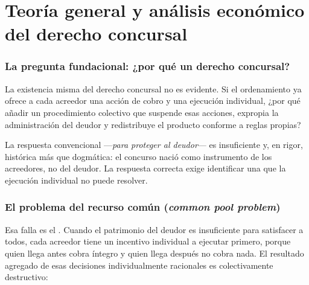 \chapter{Teoría general y análisis económico del derecho concursal}
\label{cap:teoria-economica}


\bloqueTeorico

\subsection{La pregunta fundacional: ¿por qué un derecho concursal?}

La existencia misma del derecho concursal no es evidente. Si el ordenamiento ya ofrece a cada
acreedor una acción de cobro y una ejecución individual, ¿por qué añadir un procedimiento
colectivo que suspende esas acciones, expropia la administración del deudor y redistribuye el
producto conforme a reglas propias?

La respuesta convencional ---\emph{para proteger al deudor}--- es insuficiente y, en rigor,
histórica más que dogmática: el concurso nació como instrumento de los acreedores, no del deudor.
La respuesta correcta exige identificar una  que la ejecución individual
no puede resolver.

\subsection{El problema del recurso común (\emph{common pool problem})}

Esa falla es el . Cuando el patrimonio del deudor es
insuficiente para satisfacer a todos, cada acreedor tiene un incentivo individual a ejecutar
primero, porque quien llega antes cobra íntegro y quien llega después no cobra nada. El resultado
agregado de esas decisiones individualmente racionales es colectivamente destructivo:

